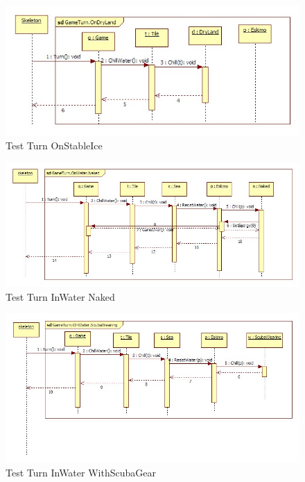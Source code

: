 \begin{figure}[h]
	\begin{center}
		\includegraphics[width=17cm]{chapters/chapter05/diagrams/Test_Turn_OnStableIce.jpg}
		\caption{Test Turn OnStableIce}
		\label{fig:Test Turn OnStableIce}
	\end{center}
\end{figure}

\begin{figure}[h]
	\begin{center}
		\includegraphics[width=17cm]{chapters/chapter05/diagrams/Test_Turn_InWater_Naked.jpg}
		\caption{Test Turn InWater Naked}
		\label{fig:Test Turn InWater Naked}
	\end{center}
\end{figure}

\begin{figure}[h]
	\begin{center}
		\includegraphics[width=17cm]{chapters/chapter05/diagrams/Test_Turn_InWater_WithScubaGear.jpg}
		\caption{Test Turn InWater WithScubaGear}
		\label{fig:Test Turn InWater WithScubaGear}
	\end{center}
\end{figure}

